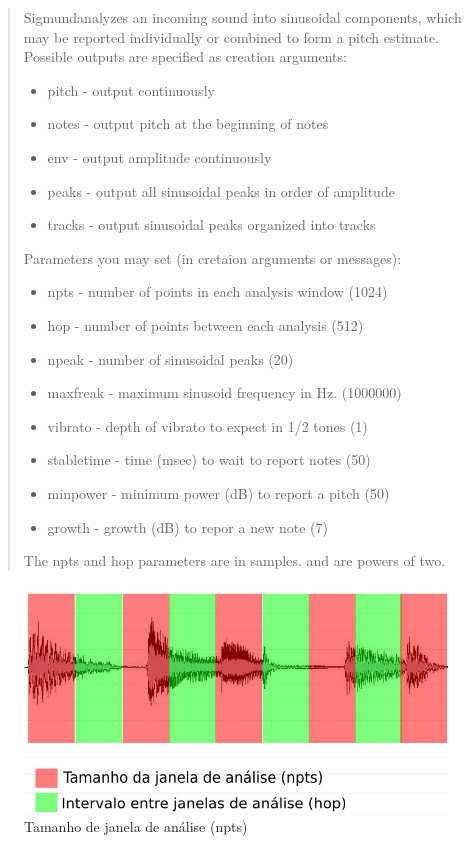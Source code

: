 \documentclass{ppgmus}
\begin{document}
\begin{quote}
{ Sigmund\texttildelow analyzes an incoming sound into sinusoidal
components, which may be reported individually or combined to
form a pitch estimate. Possible outputs are specified as creation
arguments:

\begin{itemize}
 \item pitch - output continuously
 \item notes - output pitch at the beginning of notes
 \item env - output amplitude continuously
 \item peaks - output all sinusoidal peaks in order of amplitude
 \item tracks - output sinusoidal peaks organized into tracks
\end{itemize}
Parameters you may set (in cretaion arguments or messages):

\begin{itemize}
 \item npts - number of points in each analysis window (1024)
 \item hop - number of points between each analysis (512)
 \item npeak - number of sinusoidal peaks (20)
 \item maxfreak - maximum sinusoid frequency in Hz. (1000000)
 \item vibrato - depth of vibrato to expect in 1/2 tones (1)
 \item stabletime - time (msec) to wait to report notes (50)
 \item minpower - minimum power (dB) to report a pitch (50)
 \item growth - growth (dB) to repor a new note (7) 
\end{itemize}
The npts and hop parameters are in samples. and are powers of two.}
\end{quote} 


\begin{figure}
\includegraphics[scale=.7]{sigmund}
\caption{Tamanho de janela de análise (npts)}
\label{janela-analise}
\end{figure}
\end{document}
